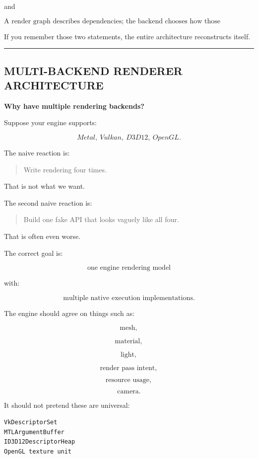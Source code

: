 and

\[
\boxed{
\text{A render graph describes dependencies;
the backend chooses how those dependencies become GPU commands.}
}
\]

If you remember those two statements, the entire architecture reconstructs itself.

\begin{center}\rule{0.5\linewidth}{0.5pt}\end{center}

\subsection{MULTI-BACKEND RENDERER ARCHITECTURE}\label{06-engine-ii-ch043-multi-backend-renderer-architecture}

\textbf{Why have multiple rendering backends?}

Suppose your engine supports:

\[
Metal,\ Vulkan,\ D3D12,\ OpenGL.
\]

The naive reaction is:

\begin{quote}
Write rendering four times.
\end{quote}

That is not what we want.

The second naive reaction is:

\begin{quote}
Build one fake API that looks vaguely like all four.
\end{quote}

That is often even worse.

The correct goal is:

\[
\boxed{
\text{one engine rendering model}
}
\]

with:

\[
\boxed{
\text{multiple native execution implementations}.
}
\]

The engine should agree on things such as:

\[
\text{mesh},
\]

\[
\text{material},
\]

\[
\text{light},
\]

\[
\text{render pass intent},
\]

\[
\text{resource usage},
\]

\[
\text{camera}.
\]

It should not pretend these are universal:

\begin{verbatim}
VkDescriptorSet
MTLArgumentBuffer
ID3D12DescriptorHeap
OpenGL texture unit
\end{verbatim}

